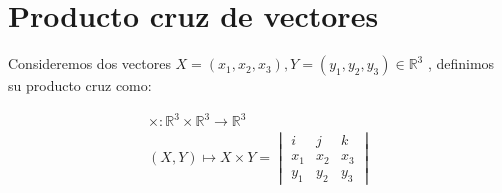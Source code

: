 \documentclass{article}
\begin{document}
\section{Producto cruz de vectores}

  Consideremos dos vectores $ X = (x_{1},x_{2},x_{3}) ,Y=(y_{1},y_{2},y_{3}) \in \mathbb{R}^{3}$ , definimos su producto cruz como:

  \begin{gather*}
    \times : \mathbb{R}^{3} \times \mathbb{R}^{3} \longrightarrow \mathbb{R}^{3} \\
    (X, Y) \longmapsto X \times Y =  \begin{vmatrix}
                                          i     & j     & k     \\
                                          x_{1} & x_{2} & x_{3} \\
                                          y_{1} & y_{2} & y_{3} 
                                      \end{vmatrix} 
  \end{gather*}

	
\end{document}
